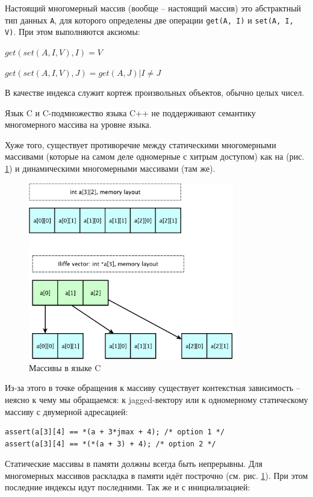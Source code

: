 \documentclass[a4paper,12pt,oneside]{article}
\begin{document}
Настоящий многомерный массив (вообще -- настоящий массив) это абстрактный тип данных \lstinline!A!, для которого определены две операции \lstinline!get(A, I)! и \lstinline!set(A, I, V)!. При этом выполняются аксиомы:

$get(set(A,I,V),I)=V$

$get(set(A,I,V),J)=get(A,J)|I \neq J$

В качестве индекса служит кортеж произвольных объектов, обычно целых чисел.

Язык C и C-подмножество языка C++ не поддерживают семантику многомерного массива на уровне языка.

Хуже того, существует противоречие между статическими многомерными массивами (которые на самом деле одномерные с хитрым доступом) как на (рис. \ref{fig:c_arrays}) и динамическими многомерными массивами (там же).

\begin{figure}[h!]
\centering
\includegraphics[width=0.8\textwidth]{illustrations/arraylayout-crop.pdf}
\caption{Массивы в языке C}
\label{fig:c_arrays}
\end{figure}

Из-за этого в точке обращения к массиву существует контекстная зависимость -- неясно к чему мы обращаемся: к jagged-вектору или к одномерному статическому массиву с двумерной адресацией:

\begin{lstlisting}
assert(a[3][4] == *(a + 3*jmax + 4); /* option 1 */
assert(a[3][4] == *(*(a + 3) + 4); /* option 2 */
\end{lstlisting}

Статические массивы в памяти должны всегда быть непрерывны. Для многомерных массивов раскладка в памяти идёт построчно (см. рис. \ref{fig:c_arrays}). При этом последние индексы идут последними. Так же и с инициализацией:
\end{document}

